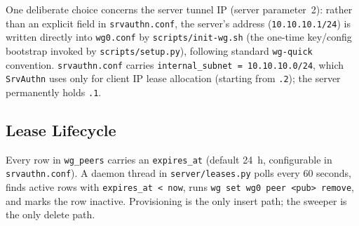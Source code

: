 One deliberate choice concerns the server tunnel IP (server parameter~2):
rather than an explicit field in \texttt{srvauthn.conf}, the server's
address (\texttt{10.10.10.1/24}) is written directly into
\texttt{wg0.conf} by \texttt{scripts/init-wg.sh} (the one-time key/config
bootstrap invoked by \texttt{scripts/setup.py}), following standard
\texttt{wg-quick} convention.
\texttt{srvauthn.conf} carries \texttt{internal\_subnet = 10.10.10.0/24},
which \texttt{SrvAuthn} uses only for client IP lease allocation (starting
from \texttt{.2}); the server permanently holds \texttt{.1}.

\subsection{Lease Lifecycle}
Every row in \texttt{wg\_peers} carries an \texttt{expires\_at}
(default 24~h, configurable in \texttt{srvauthn.conf}).
A daemon thread in \texttt{server/leases.py} polls every 60 seconds,
finds active rows with \texttt{expires\_at < now}, runs
\texttt{wg set wg0 peer <pub> remove}, and marks the row inactive.
Provisioning is the only insert path; the sweeper is the only delete path.
